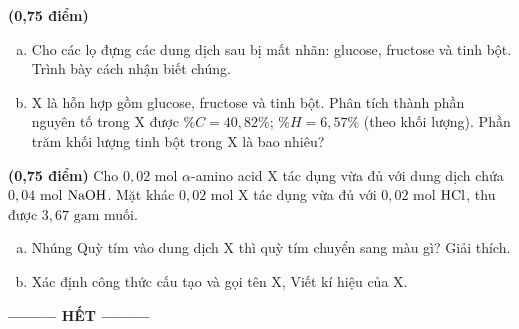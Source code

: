 \documentclass[12pt,a4paper]{article}
\begin{document}
\begin{ex}
\textbf{(0,75 điểm)}
\begin{enumerate}[a)]
	\item Cho các lọ đựng các dung dịch sau bị mất nhãn: glucose, fructose và tinh bột. Trình bày cách nhận biết chúng.
	\item X là hỗn hợp gồm glucose, fructose và tinh bột. Phân tích thành phần nguyên tố trong X được $\%C = 40{,}82\%$; $\%H = 6{,}57\%$ (theo khối lượng). Phần trăm khối lượng tinh bột trong X là bao nhiêu?
\end{enumerate}
\loigiai{}
\end{ex}

\begin{ex}
\textbf{(0,75 điểm)} Cho $0{,}02\text{ mol}$ $\alpha$-amino acid X tác dụng vừa đủ với dung dịch chứa $0{,}04\text{ mol}$ $\ce{NaOH}$. Mặt khác $0{,}02\text{ mol}$ X tác dụng vừa đủ với $0{,}02\text{ mol}$ $\ce{HCl}$, thu được $3{,}67\text{ gam}$ muối.
\begin{enumerate}[a)]
	\item Nhúng Quỳ tím vào dung dịch X thì quỳ tím chuyển sang màu gì? Giải thích.
	\item Xác định công thức cấu tạo và gọi tên X, Viết kí hiệu của X.
\end{enumerate}
\loigiai{}
\end{ex}

\begin{center}
\textbf{--------- HẾT ---------}
\end{center}
\end{document}
